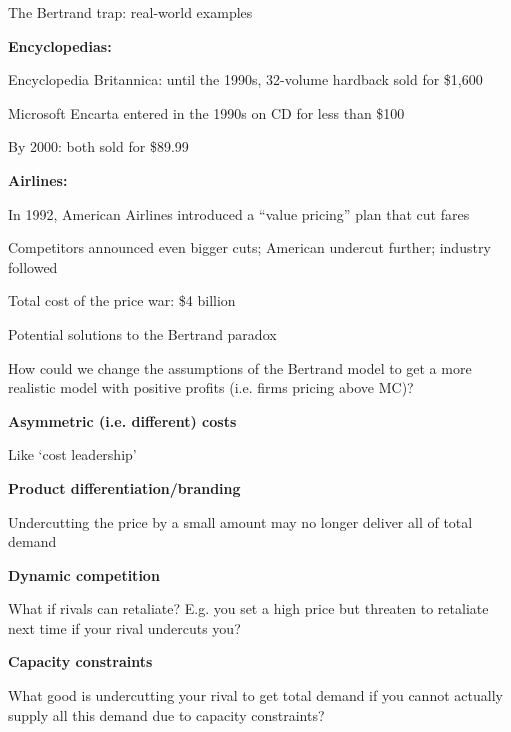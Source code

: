 \documentclass[notes,11pt, aspectratio=169]{beamer}
\newenvironment{wideitemize}{\itemize\addtolength{\itemsep}{10pt}}{\enditemize}
\begin{document}
\begin{frame}{The Bertrand trap: real-world examples}
	\begin{wideitemize}
		\item \textbf{Encyclopedias:}
		\begin{wideitemize}
			\item Encyclopedia Britannica: until the 1990s, 32-volume hardback sold for \$1,600
			\item Microsoft Encarta entered in the 1990s on CD for less than \$100
			\item By 2000: both sold for \$89.99
		\end{wideitemize}
		\item \textbf{Airlines:}
		\begin{wideitemize}
			\item In 1992, American Airlines introduced a ``value pricing'' plan that cut fares
			\item Competitors announced even bigger cuts; American undercut further; industry followed
			\item Total cost of the price war: \$4 billion
		\end{wideitemize}
	\end{wideitemize}
\end{frame}

\begin{frame}{Potential solutions to the Bertrand paradox}
	\begin{wideitemize}
		\item How could we change the assumptions of the Bertrand model to get a more realistic model with positive profits (i.e. firms pricing above MC)?
		\pause
		\item \textbf{Asymmetric (i.e. different) costs}
		\begin{wideitemize}
			\item Like `cost leadership'
		\end{wideitemize}
		\item \textbf{Product differentiation/branding}
		\begin{wideitemize}
			\item Undercutting the price by a small amount may no longer deliver all of total demand
		\end{wideitemize}
		\item \textbf{Dynamic competition}
		\begin{wideitemize}
			\item What if rivals can retaliate? E.g. you set a high price but threaten to retaliate next time if your rival undercuts you?
		\end{wideitemize}
		\item \textbf{Capacity constraints}
		\begin{wideitemize}
			\item What good is undercutting your rival to get total demand if you cannot actually supply all this demand due to capacity constraints?
		\end{wideitemize}
	\end{wideitemize}
\end{frame}
\end{document}
